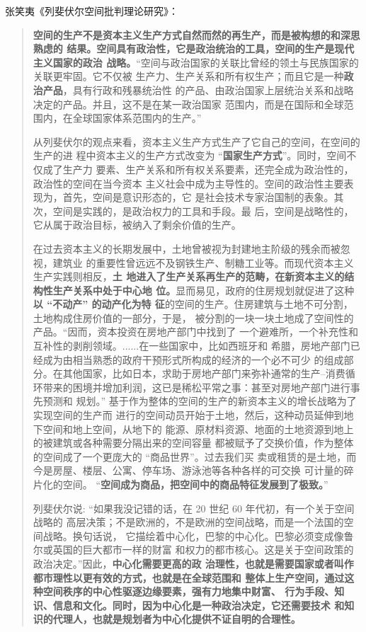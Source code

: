 张笑夷《列斐伏尔空间批判理论研究》\cite{zhangxiaoyi}：
\begin{quotation}
  \textbf{空间的生产不是资本主义生产方式自然而然的再生产，而是被构想的和深思熟虑的
    结果。空间具有政治性，它是政治统治的工具，空间的生产是现代主义国家的政治
    战略。}“空间与政治国家的关联比曾经的领土与民族国家的关联更牢固。它不仅被
  生产力、生产关系和所有权生产；而且它是一种\textbf{政治产品}，具有行政和残暴统治性
  的产品、由政治国家上层统治关系和战略决定的产品。并且，这不是在某一政治国家
  范围内，而是在国际和全球范围内，在全球国家体系范围内的生产。”

  从列斐伏尔的观点来看，资本主义生产方式生产了它自己的空间，在空间的生产的进
  程中资本主义的生产方式改变为 “\textbf{国家生产方式}”。同时，空间不仅成了生产力
  要素、生产关系和所有权关系要素，还完全成为政治性的，政治性的空间在当今资本
  主义社会中成为主导性的。空间的政治性主要表现为，首先，空间是意识形态的，它
  是社会技术专家治国制的表象。其次，空间是实践的，是政治权力的工具和手段。最
  后，空间是战略性的，它从属于政治目标，被纳入了剩余价值的生产。

  在过去资本主义的长期发展中，土地曾被视为封建地主阶级的残余而被忽视，建筑业
  的重要性曾远远不及钢铁生产、制糖工业等。而现代资本主义生产实践则相反，\textbf{土
    地进入了生产关系再生产的范畴，在新资本主义的结构性生产关系中处于中心地
    位。}显而易见，政府的住房规划就促进了这种\textbf{以 “不动产” 的动产化为特
    征}的空间的生产。住房建筑与土地不可分割，土地构成住房价值的一部分，于是，
  被分割的一块一块土地成了空间性的产品。“因而，资本投资在房地产部门中找到了
  一个避难所，一个补充性和互补性的剥削领域。......在一些国家中，比如西班牙和
  希腊，房地产部门已经成为由相当熟悉的政府干预形式所构成的经济的一个必不可少
  的组成部分。在其他国家，比如日本，求助于房地产部门来弥补通常的生产--消费循
  环带来的困境并增加利润，这已是稀松平常之事：甚至对房地产部门进行事先预测和
  规划。” 基于作为整体的空间的生产的新资本主义的增长战略为了实现空间的生产而
  进行的空间动员开始于土地，然后，这种动员延伸到地下空间和地上空间，从地下的
  能源、原材料资源、地面的土地资源到地上的被建筑或各种需要分隔出来的空间容量
  都被赋予了交换价值，作为整体的空间成了一个更庞大的 “商品世界”。过去我们买
  卖或租赁的是土地，而今是房屋、楼层、公寓、停车场、游泳池等各种各样的可交换
  可计量的碎片化的空间。 “\textbf{空间成为商品，把空间中的商品特征发展到了极致。}”

  列斐伏尔说: “如果我没记错的话，在 20 世纪 60 年代初，有一个关于空间战略的
  高层决策；不是欧洲的，不是欧洲的空间战略，而是一个法国的空间战略。换句话说，
  它描绘着中心化，巴黎的中心化。巴黎必须变成像鲁尔或英国的巨大都市一样的财富
  和权力的都市核心。这是关于空间政策的政治决定。”因此，\textbf{中心化需要更高的政
    治理性，也就是需要国家或者叫作都市理性以更有效的方式，也就是在全球范围和
    整体上生产空间，通过这种空间秩序的中心性驱逐边缘要素，强有力地集中财富、
    行为手段、知识、信息和文化。同时，因为中心化是一种政治决定，它还需要技术
    和知识的代理人，也就是规划者为中心化提供不证自明的合理性。}


\end{quotation}

